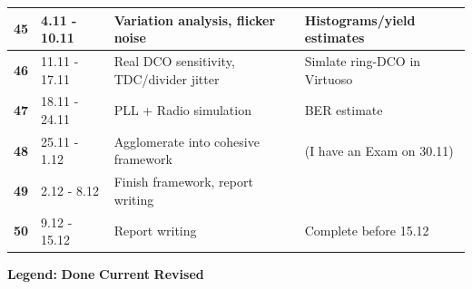\documentclass[t, screen, aspectratio=43]{beamer}
\begin{document}
\begin{frame}
\begin{table}[htb!]
\begin{tabular}{|l|l|l|l|}
			\hline 
			\rule[-1ex]{0pt}{2.5ex} \textbf{45}& 4.11 - 10.11& Variation analysis, flicker noise & Histograms/yield estimates\\ 
			\hline 
			\rule[-1ex]{0pt}{2.5ex} \textbf{46}& 11.11 - 17.11& Real DCO sensitivity, TDC/divider jitter& Simlate ring-DCO in Virtuoso\\ 
			\hline 
			\rule[-1ex]{0pt}{2.5ex} \textbf{47}& 18.11 - 24.11& PLL + Radio simulation& BER estimate\\ 
			\hline 
			\rule[-1ex]{0pt}{2.5ex} \textbf{48}& 25.11 - 1.12& Agglomerate into cohesive framework & (I have an Exam on 30.11)\\ 
			\hline 
			\rule[-1ex]{0pt}{2.5ex} \textbf{49}& 2.12 - 8.12& Finish framework, report writing& \\ 
			\hline 
			\rule[-1ex]{0pt}{2.5ex} \textbf{50}& 9.12 - 15.12& Report writing& Complete before 15.12\\ 
			\hline 
		\end{tabular}
		\begin{flushleft}\textbf{Legend:} \colorbox{red!20}{\textbf{Done}} \colorbox{green!20}{\textbf{Current}}  \colorbox{blue!20}{\textbf{Revised}}
		\end{flushleft}
	\end{table}   
\end{frame}


\end{document}
